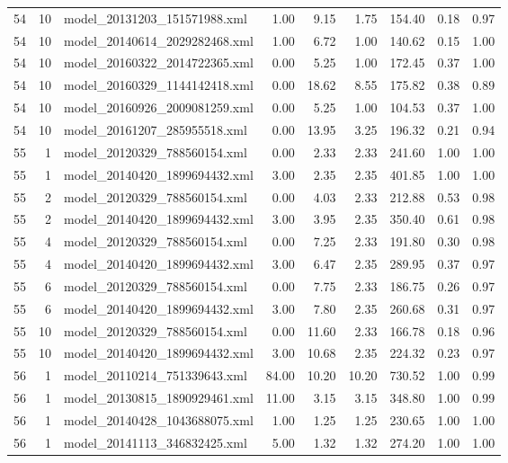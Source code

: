 \begin{table}[ht]
\begin{tabular}{rrlrrrrrr}
   54 &  10 & model\_20131203\_151571988.xml & 1.00 & 9.15 & 1.75 & 154.40 & 0.18 & 0.97 \\ 
   54 &  10 & model\_20140614\_2029282468.xml & 1.00 & 6.72 & 1.00 & 140.62 & 0.15 & 1.00 \\ 
   54 &  10 & model\_20160322\_2014722365.xml & 0.00 & 5.25 & 1.00 & 172.45 & 0.37 & 1.00 \\ 
   54 &  10 & model\_20160329\_1144142418.xml & 0.00 & 18.62 & 8.55 & 175.82 & 0.38 & 0.89 \\ 
   54 &  10 & model\_20160926\_2009081259.xml & 0.00 & 5.25 & 1.00 & 104.53 & 0.37 & 1.00 \\ 
   54 &  10 & model\_20161207\_285955518.xml & 0.00 & 13.95 & 3.25 & 196.32 & 0.21 & 0.94 \\ 
   55 &   1 & model\_20120329\_788560154.xml & 0.00 & 2.33 & 2.33 & 241.60 & 1.00 & 1.00 \\ 
   55 &   1 & model\_20140420\_1899694432.xml & 3.00 & 2.35 & 2.35 & 401.85 & 1.00 & 1.00 \\ 
   55 &   2 & model\_20120329\_788560154.xml & 0.00 & 4.03 & 2.33 & 212.88 & 0.53 & 0.98 \\ 
   55 &   2 & model\_20140420\_1899694432.xml & 3.00 & 3.95 & 2.35 & 350.40 & 0.61 & 0.98 \\ 
   55 &   4 & model\_20120329\_788560154.xml & 0.00 & 7.25 & 2.33 & 191.80 & 0.30 & 0.98 \\ 
   55 &   4 & model\_20140420\_1899694432.xml & 3.00 & 6.47 & 2.35 & 289.95 & 0.37 & 0.97 \\ 
   55 &   6 & model\_20120329\_788560154.xml & 0.00 & 7.75 & 2.33 & 186.75 & 0.26 & 0.97 \\ 
   55 &   6 & model\_20140420\_1899694432.xml & 3.00 & 7.80 & 2.35 & 260.68 & 0.31 & 0.97 \\ 
   55 &  10 & model\_20120329\_788560154.xml & 0.00 & 11.60 & 2.33 & 166.78 & 0.18 & 0.96 \\ 
   55 &  10 & model\_20140420\_1899694432.xml & 3.00 & 10.68 & 2.35 & 224.32 & 0.23 & 0.97 \\ 
   56 &   1 & model\_20110214\_751339643.xml & 84.00 & 10.20 & 10.20 & 730.52 & 1.00 & 0.99 \\ 
   56 &   1 & model\_20130815\_1890929461.xml & 11.00 & 3.15 & 3.15 & 348.80 & 1.00 & 0.99 \\ 
   56 &   1 & model\_20140428\_1043688075.xml & 1.00 & 1.25 & 1.25 & 230.65 & 1.00 & 1.00 \\ 
   56 &   1 & model\_20141113\_346832425.xml & 5.00 & 1.32 & 1.32 & 274.20 & 1.00 & 1.00 \\ 

\end{tabular}
\end{table}
